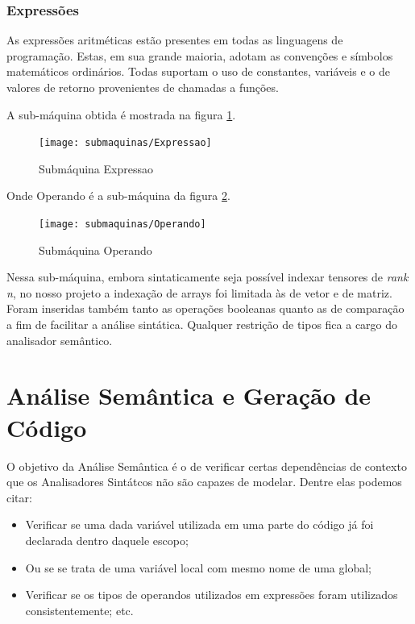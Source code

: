\documentclass[a4paper,12pt]{report}
\begin{document}
    \subsection*{Expressões}
    As expressões aritméticas estão presentes em todas as linguagens de programação. Estas, em sua grande maioria, adotam as convenções e símbolos matemáticos ordinários. Todas suportam o uso de constantes, variáveis e o de valores de retorno provenientes de chamadas a funções.

    A sub-máquina obtida é mostrada na figura \ref{fig:ExpMaq}.
    \begin{figure}[h]
        \centering
        \caption{Submáquina Expressao} 
        \label{fig:ExpMaq}   
        \texttt{[image: submaquinas/Expressao]}
    \end{figure}

    Onde Operando é a sub-máquina da figura \ref{fig:OperandoMaq}.

    \begin{figure}[h]
        \centering
        \caption{Submáquina Operando}
        \label{fig:OperandoMaq}
        \texttt{[image: submaquinas/Operando]}
    \end{figure}

    Nessa sub-máquina, embora sintaticamente seja possível indexar tensores de \textit{rank n}, no nosso projeto a indexação de arrays foi limitada às de vetor e de matriz. Foram inseridas também tanto as operações booleanas quanto as de comparação a fim de facilitar a análise sintática. Qualquer restrição de tipos fica a cargo do analisador semântico.



    \chapter*{Análise Semântica e Geração de Código}
    O objetivo da Análise Semântica é o de verificar certas dependências de contexto que os Analisadores Sintátcos não são capazes de modelar. Dentre elas podemos citar:
    
    \begin{itemize}
        \item Verificar se uma dada variável utilizada em uma parte do código já foi declarada dentro daquele escopo;
        \item Ou se se trata de uma variável local com mesmo nome de uma global;
        \item Verificar se os tipos de operandos utilizados em expressões foram utilizados consistentemente; etc.
    \end{itemize}
\end{document}
